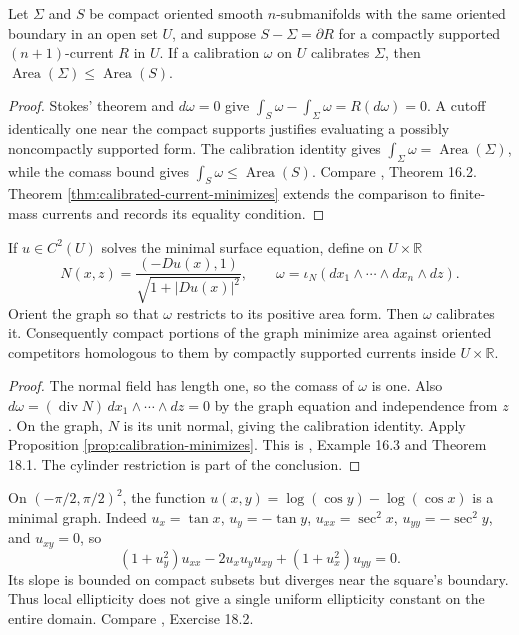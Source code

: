 \begin{proposition}\label{prop:calibration-minimizes}
Let $\Sigma$ and $S$ be compact oriented smooth $n$-submanifolds with the same oriented boundary in an open set $U$, and suppose $S-\Sigma=\partial R$ for a compactly supported $(n+1)$-current $R$ in $U$. If a calibration $\omega$ on $U$ calibrates $\Sigma$, then $\operatorname{Area}(\Sigma)\leq\operatorname{Area}(S)$.
\end{proposition}
\begin{proof}
Stokes' theorem and $d\omega=0$ give $\int_S\omega-\int_\Sigma\omega=R(d\omega)=0$. A cutoff identically one near the compact supports justifies evaluating a possibly noncompactly supported form. The calibration identity gives $\int_\Sigma\omega=\operatorname{Area}(\Sigma)$, while the comass bound gives $\int_S\omega\leq\operatorname{Area}(S)$. Compare \cite{ChMin}, Theorem 16.2. Theorem \ref{thm:calibrated-current-minimizes} extends the comparison to finite-mass currents and records its equality condition.
\end{proof}

\begin{proposition}\label{prop:graph-calibration}
If $u\in C^2(U)$ solves the minimal surface equation, define on $U\times\mathbb R$
\[
 N(x,z)=\frac{(-Du(x),1)}{\sqrt{1+|Du(x)|^2}},\qquad
 \omega=\iota_N(dx_1\wedge\cdots\wedge dx_n\wedge dz).
\]
Orient the graph so that $\omega$ restricts to its positive area form. Then $\omega$ calibrates it. Consequently compact portions of the graph minimize area against oriented competitors homologous to them by compactly supported currents inside $U\times\mathbb R$.
\end{proposition}
\begin{proof}
The normal field has length one, so the comass of $\omega$ is one. Also $d\omega=(\operatorname{div}N)\,dx_1\wedge\cdots\wedge dz=0$ by the graph equation and independence from $z$. On the graph, $N$ is its unit normal, giving the calibration identity. Apply Proposition \ref{prop:calibration-minimizes}. This is \cite{ChMin}, Example 16.3 and Theorem 18.1. The cylinder restriction is part of the conclusion.
\end{proof}

\begin{example}\label{ex:scherk-graph}
On $(-\pi/2,\pi/2)^2$, the function $u(x,y)=\log(\cos y)-\log(\cos x)$ is a minimal graph. Indeed $u_x=\tan x$, $u_y=-\tan y$, $u_{xx}=\sec^2x$, $u_{yy}=-\sec^2y$, and $u_{xy}=0$, so
\[
 (1+u_y^2)u_{xx}-2u_xu_yu_{xy}+(1+u_x^2)u_{yy}=0.
\]
Its slope is bounded on compact subsets but diverges near the square's boundary. Thus local ellipticity does not give a single uniform ellipticity constant on the entire domain. Compare \cite{ChMin}, Exercise 18.2.
\end{example}
